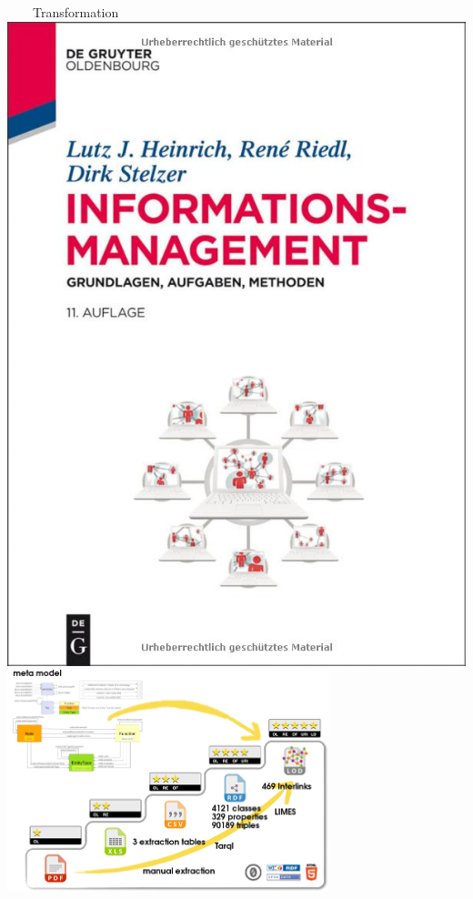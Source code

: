 \documentclass[aspectratio=1610,12pt]{beamer}
\begin{document}
\begin{frame}[plain]{~~~~Transformation}
\centering\includegraphics[height=0.21\textheight,keepaspectratio]{img/book-he.jpg}
\centering\includegraphics[width=0.7\textwidth,keepaspectratio]{img/5star.png}
\end{frame}
\restoregeometry
\end{document}
